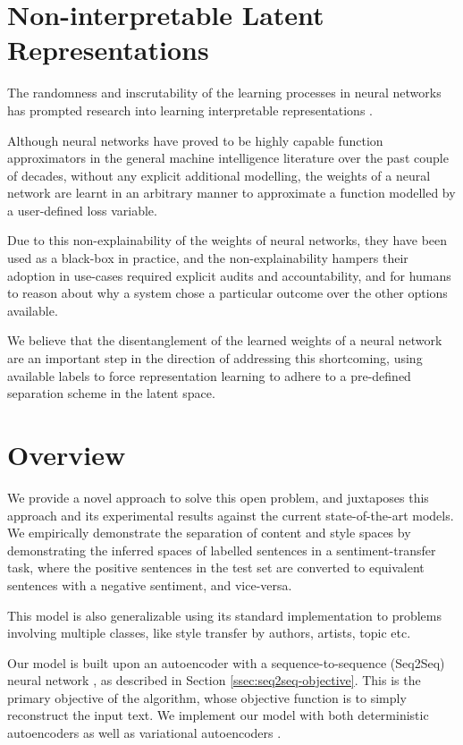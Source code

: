 \section{Non-interpretable Latent Representations}

The randomness and inscrutability of the learning processes in neural networks has prompted research into learning interpretable representations \citep{chen2016infogan}.

Although neural networks have proved to be highly capable function approximators in the general machine intelligence literature over the past couple of decades, without any explicit additional modelling, the weights of a neural network are learnt in an arbitrary manner to approximate a function modelled by a user-defined loss variable.

Due to this non-explainability of the weights of neural networks, they have been used as a black-box in practice, and the non-explainability hampers their adoption in use-cases required explicit audits and accountability, and for humans to reason about why a system chose a particular outcome over the other options available.

We believe that the disentanglement of the learned weights of a neural network are an important step in the direction of addressing this shortcoming, using available labels to force representation learning to adhere to a pre-defined separation scheme in the latent space.


\section{Overview}

We provide a novel approach to solve this open problem, and juxtaposes this approach and its experimental results against the current state-of-the-art models. We empirically demonstrate the separation of content and style spaces by demonstrating the inferred spaces of labelled sentences in a sentiment-transfer task, where the positive sentences in the test set are converted to equivalent sentences with a negative sentiment, and vice-versa.

This model is also generalizable using its standard implementation to problems involving multiple classes, like style transfer by authors, artists, topic etc.

Our model is built upon an autoencoder with a sequence-to-sequence (Seq2Seq) neural network \citep{sutskever2014sequence}, as described in Section \ref{ssec:seq2seq-objective}. This is the primary objective of the algorithm, whose objective function is to simply reconstruct the input text. We implement our model with both deterministic autoencoders \citep{baldi2012autoencoders} as well as variational autoencoders \citep{kingma2013auto}.

